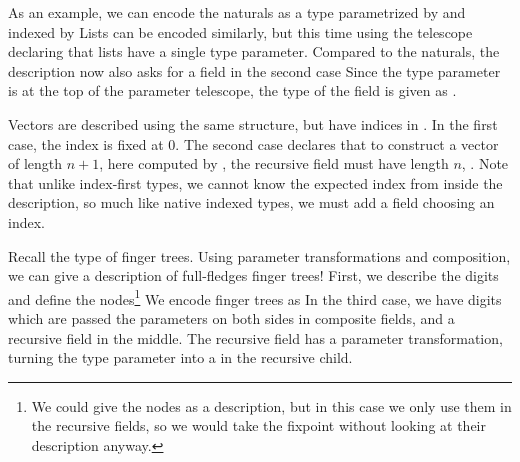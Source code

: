 
As an example, we can encode the naturals as a type parametrized by  and indexed by 
Lists can be encoded similarly, but this time using the telescope
declaring that lists have a single type parameter. Compared to the naturals, the description now also asks for a field in the second case
Since the type parameter is at the top of the parameter telescope, the type of the field is given as .

Vectors are described using the same structure, but have indices in \bN{}.
In the first case, the index is fixed at 0. The second case declares that to construct a vector of length $n + 1$, here computed by , the recursive field must have length $n$, . Note that unlike index-first types, we cannot know the expected index from inside the description, so much like native indexed types, we must add a field choosing an index.

Recall the type of finger trees. Using parameter transformations and composition, we can give a description of full-fledges finger trees! First, we describe the digits
and define the nodes\footnote{We could give the nodes as a description, but in this case we only use them in the recursive fields, so we would take the fixpoint without looking at their description anyway.}
We encode finger trees as
In the third case, we have digits which are passed the parameters on both sides in composite fields, and a recursive field in the middle. The recursive field has a parameter transformation, turning the type parameter  into a  in the recursive child.




